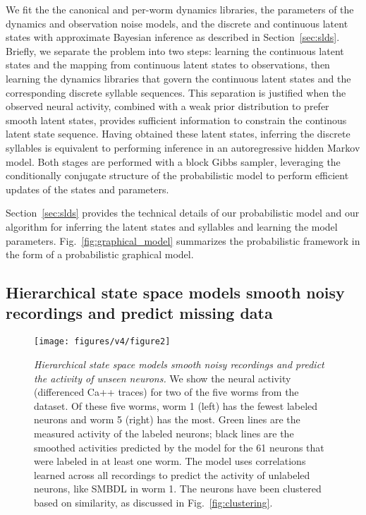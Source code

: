 \documentclass[11pt]{article}
\begin{document}
We fit the the canonical and per-worm dynamics libraries, the
parameters of the dynamics and observation noise models, and the
discrete and continuous latent states with approximate Bayesian
inference as described in Section~\ref{sec:slds}. Briefly, we separate
the problem into two steps: learning the continuous latent states and
the mapping from continuous latent states to observations, then
learning the dynamics libraries that govern the continuous latent
states and the corresponding discrete syllable sequences.  This
separation is justified when the observed neural activity, combined
with a weak prior distribution to prefer smooth latent states,
provides sufficient information to constrain the continous latent
state sequence.  Having obtained these latent states, inferring the
discrete syllables is equivalent to performing inference in an
autoregressive hidden Markov model. Both stages are performed with a
block Gibbs sampler, leveraging the conditionally conjugate structure
of the probabilistic model to perform efficient updates of the states
and parameters.

Section~\ref{sec:slds} provides the technical details of our
probabilistic model and our algorithm for inferring the latent states
and syllables and learning the model parameters.
Fig.~\ref{fig:graphical_model} summarizes the probabilistic framework
in the form of a probabilistic graphical model.


\subsection*{Hierarchical state space models smooth noisy recordings and predict missing data}

\begin{figure}[t!]
\centering
\texttt{[image: figures/v4/figure2]} 
\caption{ \textit{Hierarchical state space models smooth noisy
    recordings and predict the activity of unseen neurons.}  We show
  the neural activity (differenced Ca++ traces) for two of the
  five worms from the \citet{kato2015global} dataset.  Of these five
  worms, worm 1 (left) has the fewest labeled neurons and worm 5
  (right) has the most.  Green lines are the measured activity of the
  labeled neurons; black lines are the smoothed activities predicted
  by the model for the 61 neurons that were labeled in at least one
  worm.  The model uses correlations learned across all recordings to
  predict the activity of unlabeled neurons, like \textsf{SMBDL} in
  worm 1.  The neurons have been clustered based on similarity, as
  discussed in Fig.~\ref{fig:clustering}.  }
\label{fig:smoothing}
\end{figure}
\end{document}
